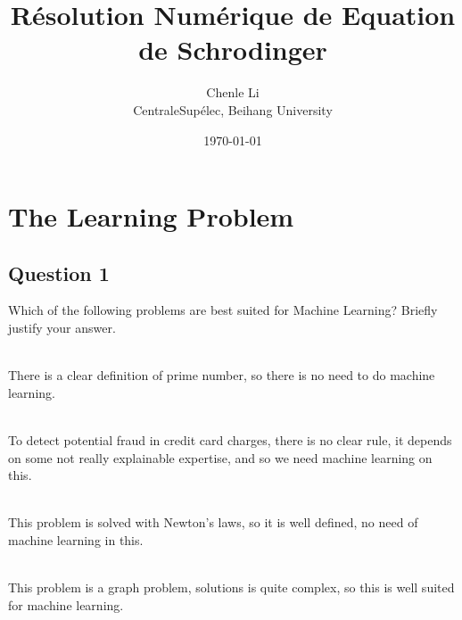 \documentclass{article}
\title{R\'esolution Num\'erique de Equation de Schrodinger}
\author{Chenle Li \\CentraleSup\'elec, Beihang University}
\date{\today}
\begin{document}
\hrulefill\hspace{0.2cm} \floweroneleft\floweroneright \hspace{0.2cm} \hrulefill
{\let\newpage\relax\maketitle}

\tableofcontents

\newpage
\section{The Learning Problem}
\subsection{Question 1}

\noindent Which of the following problems are best suited for Machine Learning? Briefly justify your answer.

\vspace{0.5em}

\\

There is a clear definition of prime number, so there is no need to do machine learning.

\vspace{1em}

\\

To detect potential fraud in credit card charges, there is no clear rule, it depends on some not really explainable 
expertise, and so we need machine learning on this.

\vspace{1em}
\\

This problem is solved with Newton's laws, so it is well defined, no need of machine learning in this.

\vspace{1em}

\\

This problem is a graph problem, solutions is quite complex, so this is well suited for machine learning.
\end{document}
